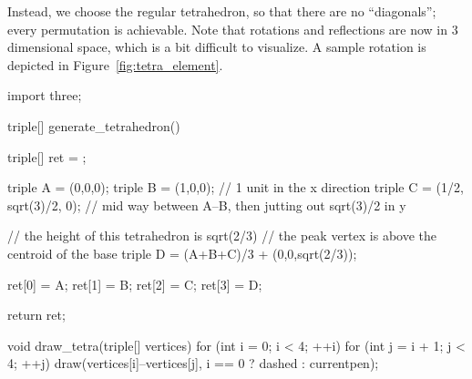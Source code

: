 \documentclass[../gatm_answers.tex]{subfiles}
\begin{document}
\noindent Instead, we choose the regular tetrahedron, so that there are no ``diagonals''; every permutation is achievable. Note that rotations and reflections are now in $3$ dimensional space, which is a bit difficult to visualize. A sample rotation is depicted in Figure~\ref{fig:tetra_element}.

\begin{asydef}
import three;

triple[] generate_tetrahedron() {
	triple[] ret = {};

	triple A = (0,0,0);
	triple B = (1,0,0); // 1 unit in the x direction
	triple C = (1/2, sqrt(3)/2, 0); // mid way between A--B, then jutting out sqrt(3)/2 in y

	// the height of this tetrahedron is sqrt(2/3)
	// the peak vertex is above the centroid of the base
	triple D = (A+B+C)/3 + (0,0,sqrt(2/3));

	ret[0] = A;
	ret[1] = B;
	ret[2] = C;
	ret[3] = D;

	return ret;
}

void draw_tetra(triple[] vertices) {
	for (int i = 0; i < 4; ++i) {
		for (int j = i + 1; j < 4; ++j) {
			draw(vertices[i]--vertices[j], i == 0 ? dashed : currentpen);
		}
	}
}

\end{asydef}
\end{document}
